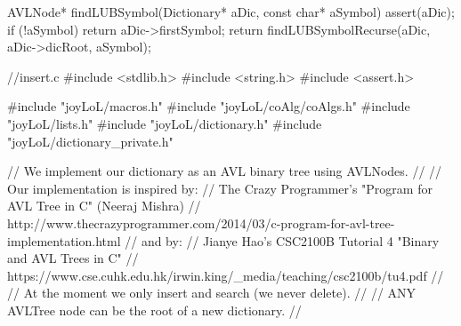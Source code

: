 AVLNode* findLUBSymbol(Dictionary* aDic, const char* aSymbol) {
  assert(aDic);
  if (!aSymbol) return aDic->firstSymbol;
  return findLUBSymbolRecurse(aDic, aDic->dicRoot, aSymbol);
}

\stoptyping

\starttyping
//insert.c
#include <stdlib.h>
#include <string.h>
#include <assert.h>

#include "joyLoL/macros.h"
#include "joyLoL/coAlg/coAlgs.h"
#include "joyLoL/lists.h"
#include "joyLoL/dictionary.h"
#include "joyLoL/dictionary_private.h"

// We implement our dictionary as an AVL binary tree using AVLNodes.
//
// Our implementation is inspired by:
// The Crazy Programmer's "Program for AVL Tree in C" (Neeraj Mishra)
// http://www.thecrazyprogrammer.com/2014/03/c-program-for-avl-tree-implementation.html
// and by:
// Jianye Hao's CSC2100B Tutorial 4 "Binary and AVL Trees in C"
// https://www.cse.cuhk.edu.hk/irwin.king/_media/teaching/csc2100b/tu4.pdf
//
// At the moment we only insert and search (we never delete).
//
// ANY AVLTree node can be the root of a new dictionary.
//

